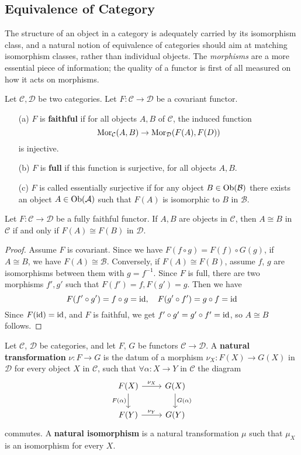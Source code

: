 \subsection{Equivalence of Category}
The structure of an object in a category is adequately carried by its isomorphism class, and a natural notion of equivalence of categories should aim at matching isomorphism classes, rather than individual objects. The \textit{morphisms} are a more essential piece of information; the quality of a functor is first of all measured on how it acts on morphisms.
\begin{definition}
Let $\mathcal{C},\mathcal{D}$ be two categories. Let $F:\mathcal{C}\to\mathcal{D}$ be a covariant functor.
\begin{enumerate}
\item[(a)] $F$ is \textbf{faithful} if for all objects $A,B$ of $\mathcal{C}$, the induced function
\[\mathrm{Mor}_{\mathcal{C}}(A,B)\to\mathrm{Mor}_{\mathcal{D}}(F(A),F(D))\]
is injective.
\item[(b)] $F$ is \textbf{full} if this function is surjective, for all objects $A,B$.
\item[(c)] $F$ is called essentially surjective if for any object $B\in\mathrm{Ob}(\mathcal{B})$ there exists an object $A\in\mathrm{Ob}(\mathcal{A})$ such that $F(A)$ is isomorphic to $B$ in $\mathcal{B}$.
\end{enumerate}
\end{definition}
\begin{lemma}\label{fully faithful fuctor}
Let $F:\mathcal{C}\to\mathcal{D}$ be a fully faithful functor. If $A,B$ are objects in $\mathcal{C}$, then $A\cong B$ in $\mathcal{C}$ if and only if $F(A)\cong F(B)$ in $\mathcal{D}$.
\end{lemma}
\begin{proof}
Assume $F$ is covariant. Since we have $F(f\circ g)=F(f)\circ G(g)$, if $A\cong B$, we have $F(A)\cong\mathscr{B}$. Conversely, if $F(A)\cong F(B)$, assume $f$, $g$ are isomorphisms between them with $g=f^{-1}$. Since $F$ is full, there are two morphisms $f',g'$ such that $F(f')=f,F(g')=g$. Then we have
\[F(f'\circ g')=f\circ g=\mathrm{id},\quad F(g'\circ f')=g\circ f=\operatorname{id}\]
Since $F(\operatorname{id})=\operatorname{id}$, and $F$ is faithful, we get $f'\circ g'=g'\circ f'=\operatorname{id}$, so $A\cong B$ follows.
\end{proof}
\begin{definition}
Let $\mathcal{C}$, $\mathcal{D}$ be categories, and let $F$, $G$ be functors $\mathcal{C}\to\mathcal{D}$. A \textbf{natural transformation} $\nu:F\to G$ is the datum of a morphism $\nu_X:F(X)\to G(X)$ in $\mathcal{D}$ for every object $X$ in $\mathcal{C}$, such that $\forall\alpha:X\to Y$ in $\mathcal{C}$ the diagram
\[\begin{tikzcd}
F(X)\ar[r,"\nu_X"]\ar[d,swap,"F(\alpha)"]&G(X)\ar[d,"G(\alpha)"]\\
F(Y)\ar[r,"\nu_Y"]&G(Y)
\end{tikzcd}\]
commutes. A \textbf{natural isomorphism} is a natural transformation $\mu$ such that $\mu_X$ is an isomorphism for every $X$.
\end{definition}
